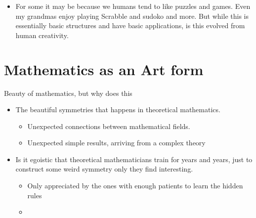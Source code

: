 \documentclass[10pt,conference]{IEEEtran}
\begin{document}
\begin{sloppy}
\begin{itemize}
    \item For some it may be because we humans tend to like puzzles and games. Even my grandmas enjoy playing Scrabble and sudoko and more. But while this is essentially basic structures and have basic applications, is this evolved from human creativity.
\end{itemize}


\newpage
\section{Mathematics as an Art form}%
\label{sec:mathematics_for_stimulating_intellectual_mind}

Beauty of mathematics, but why does this
\begin{itemize}
    \item The beautiful symmetries that happens in theoretical mathematics.
        \begin{itemize}
            \item Unexpected connections between mathematical fields.
            \item Unexpected simple results, arriving from a complex theory
        \end{itemize}
    \item Is it egoistic that theoretical mathematicians train for years and years, just to construct some weird symmetry only they find interesting.
        \begin{itemize}
            \item Only appreciated by the ones with enough patients to learn the hidden rules
            \item
        \end{itemize}
\end{itemize}

\newpage






    \printbibliography
\end{sloppy}
\end{document}
